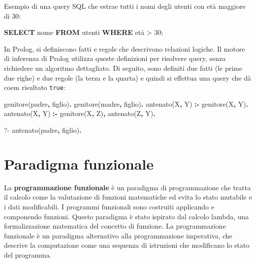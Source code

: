 \documentclass[
  letterpaper,
  DIV=11,
  numbers=noendperiod]{scrreprt}
\newenvironment{Shaded}{\begin{snugshade}}{\end{snugshade}}
\newcommand{\DataTypeTok}[1]{\textcolor[rgb]{0.68,0.00,0.00}{#1}}
\newcommand{\DecValTok}[1]{\textcolor[rgb]{0.68,0.00,0.00}{#1}}
\newcommand{\FunctionTok}[1]{\textcolor[rgb]{0.28,0.35,0.67}{#1}}
\newcommand{\KeywordTok}[1]{\textcolor[rgb]{0.00,0.23,0.31}{\textbf{#1}}}
\newcommand{\NormalTok}[1]{\textcolor[rgb]{0.00,0.23,0.31}{#1}}
\newcommand{\OperatorTok}[1]{\textcolor[rgb]{0.37,0.37,0.37}{#1}}
\begin{document}
Esempio di una query SQL che estrae tutti i nomi degli utenti con età
maggiore di 30:

\begin{Shaded}
\begin{Highlighting}[]
\KeywordTok{SELECT}\NormalTok{ nome}
\KeywordTok{FROM}\NormalTok{ utenti}
\KeywordTok{WHERE}\NormalTok{ età }\OperatorTok{\textgreater{}} \DecValTok{30}\NormalTok{;}
\end{Highlighting}
\end{Shaded}

In Prolog, si definiscono fatti e regole che descrivono relazioni
logiche. Il motore di inferenza di Prolog utilizza queste definizioni
per risolvere query, senza richiedere un algoritmo dettagliato. Di
seguito, sono definiti due fatti (le prime due righe) e due regole (la
terza e la quarta) e quindi si effettua una query che dà coem risultato
\texttt{true}:

\begin{Shaded}
\begin{Highlighting}[]
\NormalTok{genitore(padre}\KeywordTok{,}\NormalTok{ figlio)}\KeywordTok{.}
\NormalTok{genitore(madre}\KeywordTok{,}\NormalTok{ figlio)}\KeywordTok{.}
\NormalTok{antenato(}\DataTypeTok{X}\KeywordTok{,} \DataTypeTok{Y}\NormalTok{) }\KeywordTok{:{-}}\NormalTok{ genitore(}\DataTypeTok{X}\KeywordTok{,} \DataTypeTok{Y}\NormalTok{)}\KeywordTok{.}
\NormalTok{antenato(}\DataTypeTok{X}\KeywordTok{,} \DataTypeTok{Y}\NormalTok{) }\KeywordTok{:{-}}\NormalTok{ genitore(}\DataTypeTok{X}\KeywordTok{,} \DataTypeTok{Z}\NormalTok{)}\KeywordTok{,}\NormalTok{ antenato(}\DataTypeTok{Z}\KeywordTok{,} \DataTypeTok{Y}\NormalTok{)}\KeywordTok{.}

\FunctionTok{?{-}}\NormalTok{ antenato(padre}\KeywordTok{,}\NormalTok{ figlio)}\KeywordTok{.}
\end{Highlighting}
\end{Shaded}

\section{Paradigma funzionale}\label{paradigma-funzionale}

La \textbf{programmazione funzionale} è un paradigma di programmazione
che tratta il calcolo come la valutazione di funzioni matematiche ed
evita lo stato mutabile e i dati modificabili. I programmi funzionali
sono costruiti applicando e componendo funzioni. Questo paradigma è
stato ispirato dal calcolo lambda, una formalizzazione matematica del
concetto di funzione. La programmazione funzionale è un paradigma
alternativo alla programmazione imperativa, che descrive la computazione
come una sequenza di istruzioni che modificano lo stato del programma.
\end{document}
